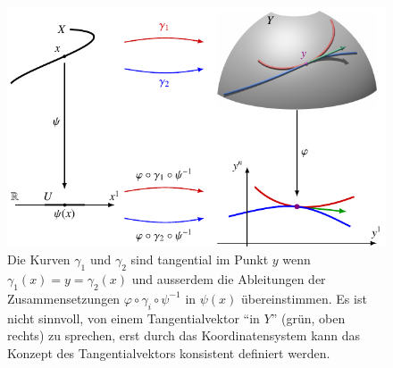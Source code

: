 %
%
%
\begin{figure}
\centering
\includegraphics{chapters/020-koordinaten/images/kurve.pdf}
\caption{Die Kurven $\gamma_1$ und $\gamma_2$ sind tangential im
Punkt $y$ wenn $\gamma_1(x)=y=\gamma_2(x)$ und ausserdem die
Ableitungen der Zusammensetzungen $\varphi\circ\gamma_i\circ\psi^{-1}$
in $\psi(x)$ übereinstimmen.
Es ist nicht sinnvoll, von einem Tangentialvektor ``in $Y$'' (grün,
oben rechts) zu sprechen, erst durch das Koordinatensystem kann
das Konzept des Tangentialvektors konsistent definiert werden.
\label{buch:koordinaten:tangentialvektoren:fig:kurve}}
\end{figure}
